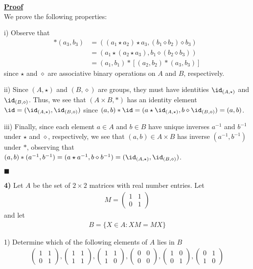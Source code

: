 \documentclass[12pt,a4paper]{article}
\newcommand{\prob}[2]{\textbf{#1)} #2}
\newenvironment{proof}
{
\textbf{\underline{Proof}} \\
}
{
\begin{flushright}
$\blacksquare$
\end{flushright}}
\begin{document}
\begin{proof}
We prove the following properties:

i) Observe that 
\begin{align*}
[(a_1,b_1)*(a_2,b_2)]*(a_3,b_3) &= ((a_1 \star a_2)\star a_3, (b_1 \diamond b_2) \diamond b_3) \\
&= (a_1 \star (a_2\star a_3), b_1 \diamond (b_2 \diamond b_3)) \\
&=  (a_1,b_1)*[(a_2,b_2)*(a_3,b_3)]
\end{align*}
since $\star$ and $\diamond$ are associative binary operations on $A$ and $B$, respectively.

ii) Since $(A,\star)$ and $(B,\diamond)$ are groups, they must have identities $\id_{(A,\star)}$ and $\id_{(B,\diamond)}$. Thus, we see that $(A \times B,*)$ has an identity element $\id = (\id_{(A,\star)},\id_{(B,\diamond)})$ since $(a,b) * \id = (a \star \id_{(A,\star)},b \diamond \id_{(B,\diamond)}) = (a,b)$.

iii) Finally, since each element $a \in A$ and $b \in B$ have unique inverses $a^{-1}$ and $b^{-1}$ under $\star$ and $\diamond$, respectively, we see that $(a,b) \in A \times B$ has inverse $(a^{-1},b^{-1})$ under $*$, observing that $(a,b) * (a^{-1},b^{-1}) = (a \star a^{-1},b \diamond b^{-1}) = (\id_{(A,\star)},\id_{(B,\diamond)})$.
\end{proof}

\prob{4}{Let $A$ be the set of $2 \times 2$ matrices with real number entries. Let
\begin{align*}
M = \begin{pmatrix}
1 & 1 \\
0 & 1
\end{pmatrix}
\end{align*}
and let
\begin{align*}
B = \{X \in A : XM = MX\}
\end{align*}
}

1) Determine which of the following elements of $A$ lies in $B$
\begin{align*}
\begin{pmatrix}
1 & 1 \\
0 & 1
\end{pmatrix}
,
\begin{pmatrix}
1 & 1 \\
1 & 1
\end{pmatrix}
,
\begin{pmatrix}
1 & 1 \\
1 & 0
\end{pmatrix}
,
\begin{pmatrix}
0 & 0 \\
0 & 0
\end{pmatrix}
,
\begin{pmatrix}
1 & 0 \\
0 & 1
\end{pmatrix}
,
\begin{pmatrix}
0 & 1 \\
1 & 0
\end{pmatrix}
\end{align*}
\end{document}
